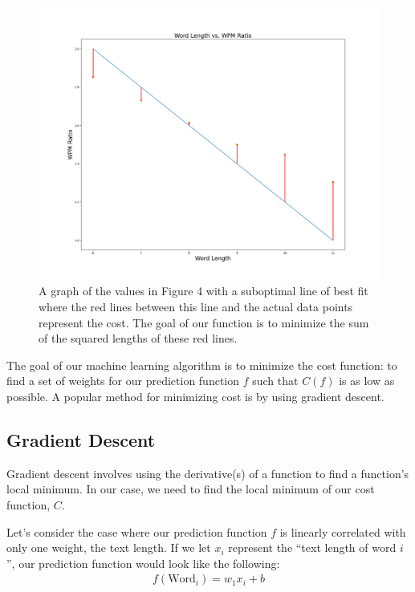 \documentclass[12pt]{article}
\begin{document}
\begin{figure}[H]
	\centering
	\caption{A graph of the values in Figure 4 with a suboptimal line of best fit where the red lines between this line and the actual data points represent the cost. The goal of our function is to minimize the sum of the squared lengths of these red lines.}
	\includegraphics[width=\linewidth]{cost-visualization.png}
\end{figure}

The goal of our machine learning algorithm is to minimize the cost function: to find a set of weights for our prediction function $f$ such that $C(f)$ is as low as possible. A popular method for minimizing cost is by using gradient descent.

\subsection*{Gradient Descent}

Gradient descent involves using the derivative(s) of a function to find a function's local minimum. In our case, we need to find the local minimum of our cost function, $C$.

Let's consider the case where our prediction function $f$ is linearly correlated with only one weight, the text length. If we let $x_i$ represent the ``text length of word $i$'', our prediction function would look like the following:
\begin{align*}
	f(\text{Word}_i) = w_1x_i + b
\end{align*}
\end{document}
